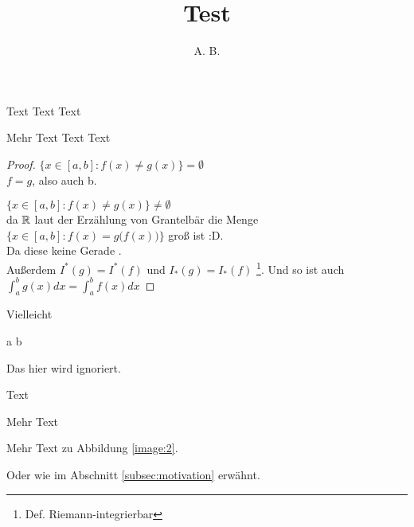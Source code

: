 \documentclass[oneside]{article}
\title{Test}
\author{A. B.}
\begin{document}
\maketitle
\tableofcontents 
\newpage

Text Text Text

Mehr Text Text Text

\begin{proof}
	$\{ x \in [a,b]: f(x) \neq g(x) \} = \emptyset $ \\
	\Implies $f = g$, also auch b.
	
	$\{ x \in [a,b]: f(x) \neq g(x) \} \neq \emptyset $ \\
	da $\mathbin{\mathbb{R}}$ laut der Erzählung von Grantelbär die Menge 
	$\big\{ x \in [a,b]: f(x) = g\big(f(x)\big) \big\}$ groß ist :D.\\
	
	Da diese keine Gerade .\\
	
	Außerdem $I^*(g) = I^*(f)$ und $I_*(g) = I_*(f)$ \footnote{Def. Riemann-integrierbar}.
	Und so ist auch $\int_{a}^{b} g(x) dx = \int_{a}^{b} f(x) dx$
\end{proof}

Vielleicht
\begin{Eq*}
	a \limplies b
\end{Eq*}

\begin{ignore}
	Das hier wird ignoriert.
\end{ignore}

Text


Mehr Text


Mehr Text zu Abbildung \ref{image:2}.

Oder wie im Abschnitt \ref{subsec:motivation} erwähnt.
\end{document}
